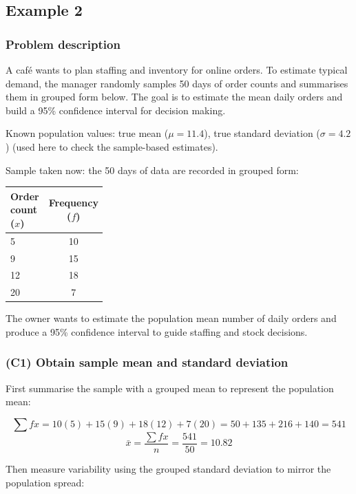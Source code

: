 \subsection{Example 2}\label{sec:interval-example1-2}

\subsubsection{Problem description}\label{subsec:interval-example1-2-problem}

A café wants to plan staffing and inventory for online orders. To estimate typical demand, the manager randomly samples 50 days of order counts and summarises them in grouped form below. The goal is to estimate the mean daily orders and build a 95\% confidence interval for decision making.

Known population values: true mean (\(\mu = 11.4\)), true standard deviation (\(\sigma = 4.2\)) (used here to check the sample-based estimates).

Sample taken now: the 50 days of data are recorded in grouped form:

\begin{center}
	\begin{tabularx}{0.55\linewidth}{@{}L{0.28\linewidth}C@{}}
		\toprule
		Order count (\(x\)) & Frequency (\(f\)) \\
		 & 10 \\
		9 & 15 \\
		12 & 18 \\
		20 & 7 \\
		\bottomrule
	\end{tabularx}
\end{center}

The owner wants to estimate the population mean number of daily orders and produce a 95\% confidence interval to guide staffing and stock decisions.


\subsubsection{(C1) Obtain sample mean and standard deviation}\label{subsubsec:interval-example1-2-c1}

First summarise the sample with a grouped mean to represent the population mean:

\[
\sum f x = 10(5) + 15(9) + 18(12) + 7(20) = 50 + 135 + 216 + 140 = 541
\]
\[
\bar{x} = \frac{\sum f x}{n} = \frac{541}{50} = 10.82
\]

Then measure variability using the grouped standard deviation to mirror the population spread:

